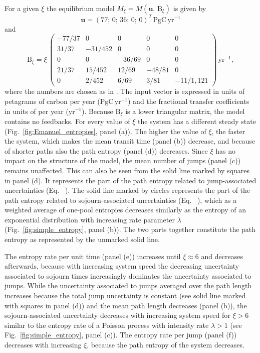 \documentclass[smallextended]{svjour3}
\makeatletter
\renewcommand*{\eqref}[1]{%
  \hyperref[{#1}]{\textup{\tagform@{\ref*{#1}}}}%
}
\renewcommand{\tens}[1]{\mathrm{#1}}
\renewcommand{\vec}[1]{\mathbf{#1}}
\newcommand{\peta}{\mathrm{P}}
\newcommand{\gC}{\mathrm{gC}}
\newcommand{\yr}{\mathrm{yr}}
\newcommand{\transpose}{T}
\makeatother
\begin{document}
For a given $\xi$ the equilibrium model $M_\xi=M(\vec{u},\,\tens{B}_\xi)$ is given by
\begin{equation}
  \vec{u} = (77;\,0;\,36;\,0;\,0)^{\transpose}\, \peta\gC\,\yr^{-1}
\end{equation}
and
\begin{equation}
    \tens{B}_\xi = \xi\,\left(\begin{matrix}
      -77/37 &       0 &      0 &      0 & 	  0\\
       31/37 & -31/452 &      0 &      0 & 	  0\\
	   0 &       0 & -36/69 &      0 & 	  0\\
       21/37 &  15/452 &  12/69 & -48/81 & 	  0\\
	   0 &   2/452 &   6/69 &   3/81 & -11/1,121
	 \end{matrix}\right)\,\yr^{-1},
\end{equation}
where the numbers are chosen as in \citet{Thompson1999GCB}. 
The input vector is expressed in units of petagrams of carbon per year ($\peta\gC\,\yr^{-1}$) and the fractional transfer coefficients in units of per year ($\yr^{-1}$).
Because $\tens{B}_\xi$ is a lower triangular matrix, the model contains no feedbacks.
For every value of $\xi$ the system has a different steady state (Fig.~\ref{fig:Emanuel_entropies}, panel (a)).
The higher the value of $\xi$, the faster the system, which makes the mean transit time (panel (b)) decrease, and because of shorter paths also the path entropy (panel (d)) decreases.
Since $\xi$ has no impact on the structure of the model, the mean number of jumps (panel (c)) remains unaffected.
This can also be seen from the solid line marked by squares in panel (d).
It represents the part of the path entropy related to jump-associated uncertainties (Eq.~\eqref{eqn:H_discrete}).
The solid line marked by circles represents the part of the path entropy related to sojourn-associated uncertainties (Eq.~\eqref{eqn:H_continuous}), which as a weighted average of one-pool entropies decreases similarly as the entropy of an exponential distribution with increasing rate parameter $\lambda$ (Fig.~\ref{fig:simple_entropy}, panel (b)).
The two parts together constitute the path entropy as represented by the unmarked solid line.

The entropy rate per unit time (panel (e)) increases until $\xi\approx6$ and decreases afterwards, because with increasing system speed the decreasing uncertainty associated to sojourn times increasingly dominates the uncertainty associated to jumps.
While the uncertainty associated to jumps averaged over the path length increases because the total jump uncertainty is constant (see solid line marked with squares in panel (d)) and the mean path length decreases (panel (b)), the sojourn-associated uncertainty decreases with increasing system speed for $\xi>6$ similar to the entropy rate of a Poisson process with intensity rate $\lambda>1$ (see Fig.~\ref{fig:simple_entropy}, panel (c)).
The entropy rate per jump (panel (f)) decreases with increasing $\xi$, because the path entropy of the system decreases.
\end{document}
